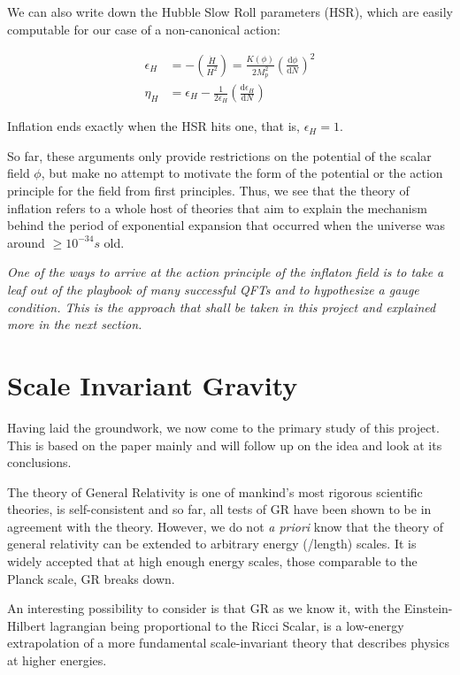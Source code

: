 \documentclass[aps,prd,reprint,preprintnumbers,showpacs,floatfix,nofootinbib,superscript address]{revtex4-2}
\begin{document}
We can also write down the Hubble Slow Roll parameters (HSR), which are easily computable for our case of a non-canonical action:

\begin{align}
    \epsilon_H &= -  \left( \frac{\dot{H}}{H^2} \right) = \frac{K(\phi)}{2 M_p^2} \left( \frac{\text{d}\phi}{\text{d}N} \right)^2  \nonumber \\
    \eta_H &= \epsilon_H - \frac{1}{2 \epsilon_H} \left( \frac{\text{d}\epsilon_H}{\text{d}N} \right)
\end{align}

Inflation ends exactly when the HSR hits one, that is, $\epsilon_H = 1$.

So far, these arguments only provide restrictions on the potential of the scalar field $\phi$, but make no attempt to motivate the form of the potential or the action principle for the field from first principles. Thus, we see that the theory of inflation refers to a whole host of theories that aim to explain the mechanism behind the period of exponential expansion that occurred when the universe was around $\geq 10^{-34}s$ old.

\textit{One of the ways to arrive at the action principle of the inflaton field is to take a leaf out of the playbook of many successful QFTs and to hypothesize a gauge condition. This is the approach that shall be taken in this project and explained more in the next section.}


\section{Scale Invariant Gravity} \label{Section 3}
Having laid the groundwork, we now come to the primary study of this project. This is based on the paper \cite{barker2024poincaregaugetheoryconformal} mainly and will follow up on the idea and look at its conclusions. 

The theory of General Relativity is one of mankind's most rigorous scientific theories, is self-consistent and so far, all tests of GR have been shown to be in agreement with the theory. However, we do not \textit{a priori} know that the theory of general relativity can be extended to arbitrary energy (/length) scales. It is widely accepted that at high enough energy scales, those comparable to the Planck scale, GR breaks down. 

An interesting possibility to consider is that GR as we know it, with the Einstein-Hilbert lagrangian being proportional to the Ricci Scalar, is a low-energy extrapolation of a more fundamental scale-invariant theory that describes physics at higher energies. 
\end{document}
